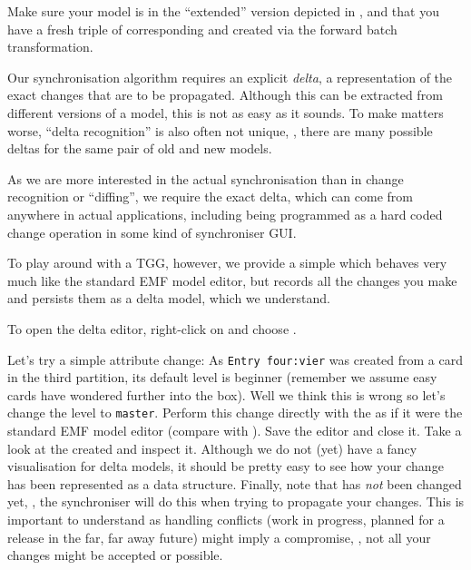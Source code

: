 \begin{stepbystep}
\item Make sure your  model is in the \enquote{extended} version depicted in , and that you have a fresh triple of corresponding  and  created via the forward batch transformation.

\item Our synchronisation algorithm requires an explicit \emph{delta}, a representation of the exact changes that are to be propagated.
Although this can be extracted from different versions of a model, this is not as easy as it sounds.
To make matters worse, \enquote{delta recognition} is also often not unique, \idest, there are many possible deltas for the same pair of old and new models.

As we are more interested in the actual synchronisation than in change recognition or \enquote{diffing}, we require the exact delta, which can come from anywhere in actual applications, including being programmed as a hard coded change operation in some kind of synchroniser GUI.

To play around with a TGG, however, we provide a simple  which behaves very much like the standard EMF model editor, but records all the changes you make and persists them as a delta model, which we understand.

To open the delta editor, right-click on  and choose .

\item Let's try a simple attribute change:  As \texttt{Entry four:vier} was created from a card in the third partition, its default level is beginner (remember we assume easy cards have wondered further into the box).
Well we think this is wrong so let's change the level to \texttt{master}.
Perform this change directly with the  as if it were the standard EMF model editor (compare with ).
Save the editor and close it.
Take a look at the created  and inspect it.
Although we do not (yet) have a fancy visualisation for delta models, it should be pretty easy to see how your change has been represented as a data structure.
Finally, note that  has \emph{not} been changed yet, \idest, the synchroniser will do this when trying to propagate your changes.
This is important to understand as handling conflicts (work in progress, planned for a release in the far, far away future) might imply a compromise, \idest, not all your changes might be accepted or possible.


\end{stepbystep}
